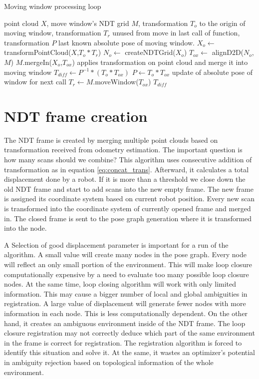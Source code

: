 \begin{algorithm}
\label{alg:move_window}
    \caption{Moving window processing loop}
\begin{algorithmic}[1]
\Require point cloud $X$, move window's \gls{NDT} grid $M$, transformation $T_{o}$ to the origin of moving window, transformation $T_{r}$ unused from move in last call of function, transformation $P$  last known absolute pose of moving window.  
	 \State $X_{o} \gets$ transformPointCloud($X$,$T_{o} * T_{r}$)
	 \State $N_{o} \gets$ createNDTGrid($X_{o}$)
	 \State $T_{ox} \gets$ alignD2D($N_{o}$,$M$)
	 \State $M$.mergeIn($X_{o}$,$T_{ox}$)
	 \Comment applies transformation on point cloud and merge it into moving window
	 \State $T_{diff} \gets P^{-1} * (T_{o} * T_{ox})$
	 \State $P \gets T_{o} * T_{ox}$
	 \Comment update of absolute pose of window for next call 
	 \State $T_{r} \gets M$.moveWindow($T_{ox}$)
	 \State \Return $T_{diff}$
 \EndFunction
\end{algorithmic}
\end{algorithm}

\newpage

\section{NDT frame creation}
\label{sec:NDT_frame}
The \gls{NDT} frame is created by merging multiple point clouds based on transformation received from odometry estimation. The important question is how many scans should we combine? This algorithm uses consecutive addition of transformation as in equation \ref{eq:concat_trans}. Afterward, it calculates a total displacement done by a robot. If it is more than a threshold we close down the old \gls{NDT} frame and start to add scans into the new empty frame. The new frame is assigned its coordinate system based on current robot position. Every new scan is transformed into the coordinate system of currently opened frame and merged in. The closed frame is sent to the pose graph generation where it is transformed into the node.

A Selection of good displacement parameter is important for a run of the algorithm. A small value will create many nodes in the pose graph. Every node will reflect an only small portion of the environment. This will make loop closure computationally expensive by a need to evaluate too many possible loop closure nodes. At the same time, loop closing algorithm will work with only limited information. This may cause a bigger number of local and global ambiguities in registration. A large value of displacement will generate fewer nodes with more information in each node. This is less computationally dependent. On the other hand, it creates an ambiguous environment inside of the \gls{NDT} frame. The loop closure registration may not correctly deduce which part of the same environment in the frame is correct for registration. The registration algorithm is forced to identify this situation and solve it. At the same, it wastes an optimizer's potential in ambiguity rejection based on topological information of the whole environment. 

